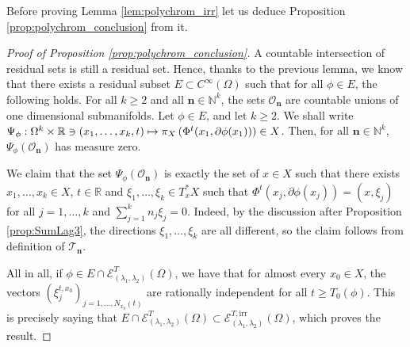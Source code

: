 \documentclass[10pt]{amsart}
\let\mathcal\mathscr
\newcommand\mto{\mathchoice{\longmapsto}{\mapsto}{\mapsto}{\mapsto}}
\newcommand{\irr}{\mathrm{irr}}
\theoremstyle{plain}
\theoremstyle{definition}
\newcommand{\N}{\mathbb{N}}
\newcommand{\R}{\mathbb{R}}
\def\calT{\mathcal{T}}
\begin{document}
Before proving Lemma \ref{lem:polychrom_irr} let us deduce Proposition \ref{prop:polychrom_conclusion} from it.
\begin{proof}[Proof of Proposition \ref{prop:polychrom_conclusion}]
A countable intersection of residual sets is still a residual set. Hence, thanks to the previous lemma, we know that there exists a residual subset $E\subset C^\infty(\Omega)$ such that for all $\phi\in E$, the following holds. For all $k\geq 2$ and all $\boldsymbol{n}\in \N^k$, the sets $\mathcal{O}_{\boldsymbol{n}}$ are countable unions of one dimensional submanifolds. Let $\phi \in E$, and let $k\geq 2$. We shall write $\Psi_\phi : \Omega^k \times \R \ni (x_1,\dots, x_k,t) \mto \pi_X \left(\Phi^t(x_1, \partial \phi(x_1))\right)\in X$. Then, for all $\boldsymbol{n}\in \N^k$, $\Psi_\phi (\mathcal{O}_{\boldsymbol{n}})$ has measure zero.

We claim that the set $\Psi_\phi (\mathcal{O}_{\boldsymbol{n}})$ is exactly the set of $x\in X$ such that there exists $x_1,\dots, x_k\in X$, $t\in\R$ and $\xi_1,\dots, \xi_k \in T^*_x X$ such that $\Phi^t(x_j, \partial \phi(x_j)) = (x,\xi_j)$ for all $j=1,\dots, k$ and $\sum_{j=1}^k n_j \xi_j= 0$. Indeed, by the discussion after Proposition \ref{prop:SumLag3}, the directions $\xi_1,\dots, \xi_k$ are all different, so the claim follows from definition of $\calT_{\boldsymbol{n}}$.

All in all, if $\phi\in E\cap \mathcal{E}^T_{(\lambda_1,\lambda_2)}(\Omega)$, we have that for almost every $x_0\in X$, the vectors $(\xi_j^{t,x_0})_{j=1,\dots,N_{x_0}(t)}$ are rationally independent for all $t\geq T_0(\phi)$. This is precisely saying that $E\cap \mathcal{E}^T_{(\lambda_1,\lambda_2)}(\Omega)\subset \mathcal{E}^{T,\irr}_{(\lambda_1,\lambda_2)}(\Omega)$, which proves the result.
\end{proof}
\end{document}
